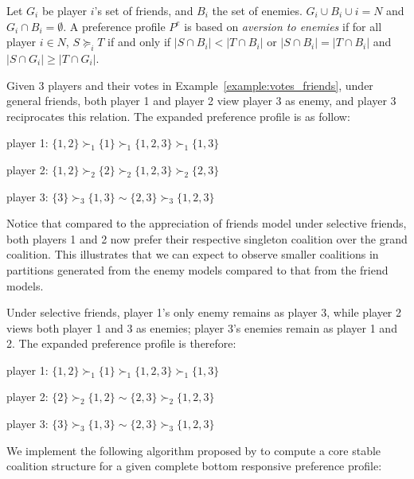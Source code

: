 Let $G_i$ be player $i$'s set of friends, and $B_i$ the set of enemies.
$G_i \cup B_i \cup i = N$ and $G_i \cap B_i = \emptyset$.
A preference profile $P^e$ is based on \textit{aversion to enemies} if for all
player $i \in N$, $S \succeq_i T$ if and only if $|S \cap B_i| < |T \cap B_i|$
or $|S \cap B_i| = |T \cap B_i|$ and $|S \cap G_i| \geq |T \cap G_i|$.

Given 3 players and their votes in Example~\ref{example:votes_friends},
under general friends, both player 1 and player 2 view player 3 as enemy, and
player 3 reciprocates this relation.
The expanded preference profile is as follow:

player 1: $\{1, 2\} \succ_1 \{1\} \succ_1 \{1, 2, 3\} \succ_1 \{1, 3\} $

player 2: $\{1, 2\} \succ_2 \{2\} \succ_2 \{1, 2, 3\} \succ_2 \{2, 3\}$

player 3: $\{3\} \succ_3 \{1, 3\} \sim \{2, 3\} \succ_3 \{1, 2, 3\}$

Notice that compared to the appreciation of friends model under selective
friends, both players 1 and 2 now prefer their respective singleton coalition
over the grand coalition.
This illustrates that we can expect to observe smaller coalitions in partitions
generated from the enemy models compared to that from the friend models.

Under selective friends, player 1's only enemy remains as player 3, while
player 2 views both player 1 and 3 as enemies; player 3's enemies remain as
player 1 and 2.
The expanded preference profile is therefore:

player 1: $\{1, 2\} \succ_1 \{1\} \succ_1 \{1, 2, 3\} \succ_1 \{1, 3\} $

player 2: $\{2\} \succ_2 \{1, 2\} \sim \{2, 3\} \succ_2 \{1, 2, 3\} $

player 3: $\{3\} \succ_3 \{1, 3\} \sim \{2, 3\} \succ_3 \{1, 2, 3\}$

We implement the following algorithm proposed by  to
compute a core stable coalition structure for a given complete bottom
responsive preference profile:

